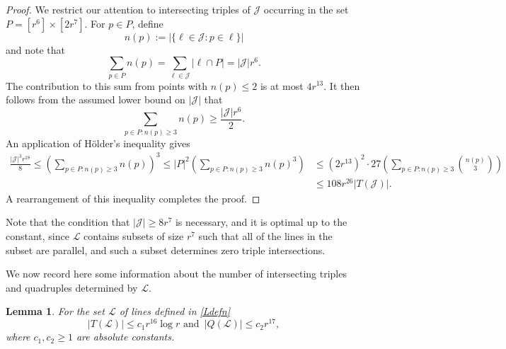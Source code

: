 \documentclass[11pt]{amsart}
\newcommand{\cL}{\mathcal{L}}
\newcommand{\cJ}{\mathcal{J}}
\newtheorem{lemma}{Lemma}
\theoremstyle{remark}
\begin{document}
\begin{proof}
    We restrict our attention to intersecting triples of $\mathcal J$ occurring in the set $P=[r^6] \times [2r^7]$. For $p \in P$, define
    \[
n(p):=| \{ \ell \in \mathcal J : p \in \ell \}|
    \]
    and note that
    \[
    \sum_{p \in P} n(p)= \sum_{\ell \in \mathcal J} |\ell \cap P|= |\mathcal J|r^6.
    \]
    The contribution to this sum from points with $n(p) \leq 2$ is at most $4r^{13}$. It then follows from the assumed lower bound on $|\mathcal J|$ that
    \[
    \sum_{p \in P: n(p) \geq 3} n(p) \geq  \frac{|\mathcal J|r^6}{2}.
    \]
    An application of Hölder's inequality gives
    \begin{align*}
    \frac{|\mathcal J|^3r^{18}}{8} \leq  \left (  \sum_{p \in P: n(p) \geq 3} n(p) \right )^3 \leq |P|^2 \left (\sum_{p \in P: n(p) \geq 3} n(p)^3 \right ) &\leq (2r^{13})^2 \cdot 27 \left (\sum_{p \in P: n(p) \geq 3} \binom{n(p)}{3} \right )
    \\& \leq 108 r^{26} |T(\mathcal J)|.
    \end{align*}
    A rearrangement of this inequality completes the proof.
\end{proof}

Note that the condition that $|\cJ| \geq 8r^7$ is necessary, and it is optimal up to the constant, since $\cL$ contains subsets of size $r^7$ such that all of the lines in the subset are parallel, and such a subset determines zero triple intersections.

We now record here some information about the number of intersecting triples and quadruples determined by $\cL$.

\begin{lemma} \label{lem:counting}
    For the set $\cL$ of lines defined in \eqref{Ldefn}
    \[
    |T( \cL)| \leq c_1 r^{16} \log r \,\, \text{and} \,\,\,  |Q(\cL)| \leq c_2 r^{17},
   \]
    where $c_1,c_2 \geq 1$ are absolute constants.
\end{lemma}
\end{document}
